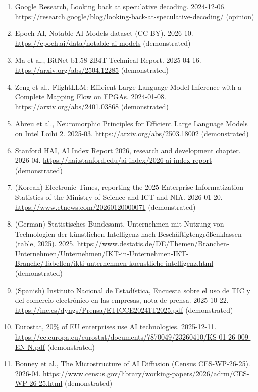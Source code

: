 \documentclass[10pt,letterpaper]{article}
\begin{document}
\begin{enumerate}
  \url{https://arxiv.org/abs/2211.17192} (established by proof in the
  source)
\item
  Google Research, Looking back at speculative decoding. 2024-12-06.
  \url{https://research.google/blog/looking-back-at-speculative-decoding/}
  (opinion)
\item
  Epoch AI, Notable AI Models dataset (CC BY). 2026-10.
  \url{https://epoch.ai/data/notable-ai-models} (demonstrated)
\item
  Ma et al., BitNet b1.58 2B4T Technical Report. 2025-04-16.
  \url{https://arxiv.org/abs/2504.12285} (demonstrated)
\item
  Zeng et al., FlightLLM: Efficient Large Language Model Inference with
  a Complete Mapping Flow on FPGAs. 2024-01-08.
  \url{https://arxiv.org/abs/2401.03868} (demonstrated)
\item
  Abreu et al., Neuromorphic Principles for Efficient Large Language
  Models on Intel Loihi 2. 2025-03.
  \url{https://arxiv.org/abs/2503.18002} (demonstrated)
\item
  Stanford HAI, AI Index Report 2026, research and development chapter.
  2026-04. \url{https://hai.stanford.edu/ai-index/2026-ai-index-report}
  (demonstrated)
\item
  (Korean) Electronic Times, reporting the 2025 Enterprise
  Informatization Statistics of the Ministry of Science and ICT and NIA.
  2026-01-20. \url{https://www.etnews.com/20260120000071} (demonstrated)
\item
  (German) Statistisches Bundesamt, Unternehmen mit Nutzung von
  Technologien der künstlichen Intelligenz nach
  Beschäftigtengrößenklassen (table, 2025). 2025.
  \url{https://www.destatis.de/DE/Themen/Branchen-Unternehmen/Unternehmen/IKT-in-Unternehmen-IKT-Branche/Tabellen/ikti-unternehmen-kuenstliche-intelligenz.html}
  (demonstrated)
\item
  (Spanish) Instituto Nacional de Estadística, Encuesta sobre el uso de
  TIC y del comercio electrónico en las empresas, nota de prensa.
  2025-10-22. \url{https://ine.es/dyngs/Prensa/ETICCE20241T2025.pdf}
  (demonstrated)
\item
  Eurostat, 20\% of EU enterprises use AI technologies. 2025-12-11.
  \url{https://ec.europa.eu/eurostat/documents/7870049/23260410/KS-01-26-009-EN-N.pdf}
  (demonstrated)
\item
  Bonney et al., The Microstructure of AI Diffusion (Census
  CES-WP-26-25). 2026-04.
  \url{https://www.census.gov/library/working-papers/2026/adrm/CES-WP-26-25.html}
  (demonstrated)

\end{enumerate}
\end{document}
